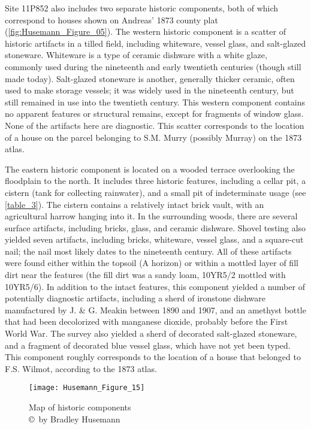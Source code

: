Site 11P852 also includes two separate historic components, both of which correspond to houses shown on Andreas’ 1873 county plat (\cref{fig:Husemann_Figure_05}). The western historic component is a scatter of historic artifacts in a tilled field, including whiteware, vessel glass, and salt-glazed stoneware. Whiteware is a type of ceramic dishware with a white glaze, commonly used during the nineteenth and early twentieth centuries (though still made today). Salt-glazed stoneware is another, generally thicker ceramic, often used to make storage vessels; it was widely used in the nineteenth century, but still remained in use into the twentieth century. This western component contains no apparent features or structural remains, except for fragments of window glass. None of the artifacts here are diagnostic. This scatter corresponds to the location of a house on the parcel belonging to S.M. Murry (possibly Murray) on the 1873 atlas.

The eastern historic component is located on a wooded terrace overlooking the floodplain to the north. It includes three historic features, including a cellar pit, a cistern (tank for collecting rainwater), and a small pit of indeterminate usage (see \cref{table_3}).
The cistern contains a relatively intact brick vault, with an agricultural harrow hanging into it. In the surrounding woods, there are several surface artifacts, including bricks, glass, and ceramic dishware. Shovel testing also yielded seven artifacts, including bricks, whiteware, vessel glass, and a square-cut nail; the nail most likely dates to the nineteenth century. All of these artifacts were found either within the topsoil (A horizon) or within a mottled layer of fill dirt near the features (the fill dirt was a sandy loam, 10YR5/2 mottled with 10YR5/6). In addition to the intact features, this component yielded a number of potentially diagnostic artifacts, including a sherd of ironstone dishware manufactured by J. \& G. Meakin between 1890 and 1907, and an amethyst bottle that had been decolorized with manganese dioxide, probably before the First World War. The survey also yielded a sherd of decorated salt-glazed stoneware, and a fragment of decorated blue vessel glass, which have not yet been typed. This component roughly corresponds to the location of a house that belonged to F.S. Wilmot, according to the 1873 atlas.

\begin{figure}[!p]
	\texttt{[image: Husemann\_Figure\_15]}
	\caption{Map of historic components
		{\normalfont\scriptsize \\ \copyright\ by Bradley Husemann
	}}
	\label{fig:Husemann_Figure_15}
\end{figure}

